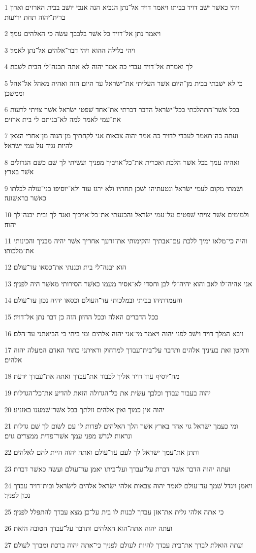 \par 1 ויהי כאשׁר ישׁב דויד בביתו ויאמר דויד אל־נתן הנביא הנה אנכי יושׁב בבית הארזים וארון ברית־יהוה תחת יריעות׃
\par 2 ויאמר נתן אל־דויד כל אשׁר בלבבך עשׂה כי האלהים עמך׃
\par 3 ויהי בלילה ההוא ויהי דבר־אלהים אל־נתן לאמר׃
\par 4 לך ואמרת אל־דויד עבדי כה אמר יהוה לא אתה תבנה־לי הבית לשׁבת׃
\par 5 כי לא ישׁבתי בבית מן־היום אשׁר העליתי את־ישׂראל עד היום הזה ואהיה מאהל אל־אהל וממשׁכן׃
\par 6 בכל אשׁר־התהלכתי בכל־ישׂראל הדבר דברתי את־אחד שׁפטי ישׂראל אשׁר צויתי לרעות את־עמי לאמר למה לא־בניתם לי בית ארזים׃
\par 7 ועתה כה־תאמר לעבדי לדויד כה אמר יהוה צבאות אני לקחתיך מן־הנוה מן־אחרי הצאן להיות נגיד על עמי ישׂראל׃
\par 8 ואהיה עמך בכל אשׁר הלכת ואכרית את־כל־אויביך מפניך ועשׂיתי לך שׁם כשׁם הגדולים אשׁר בארץ׃
\par 9 ושׂמתי מקום לעמי ישׂראל ונטעתיהו ושׁכן תחתיו ולא ירגז עוד ולא־יוסיפו בני־עולה לבלתו כאשׁר בראשׁונה׃
\par 10 ולמימים אשׁר צויתי שׁפטים על־עמי ישׂראל והכנעתי את־כל־אויביך ואגד לך ובית יבנה־לך יהוה׃
\par 11 והיה כי־מלאו ימיך ללכת עם־אבתיך והקימותי את־זרעך אחריך אשׁר יהיה מבניך והכינותי את־מלכותו׃
\par 12 הוא יבנה־לי בית וכננתי את־כסאו עד־עולם׃
\par 13 אני אהיה־לו לאב והוא יהיה־לי לבן וחסדי לא־אסיר מעמו כאשׁר הסירותי מאשׁר היה לפניך׃
\par 14 והעמדתיהו בביתי ובמלכותי עד־העולם וכסאו יהיה נכון עד־עולם׃
\par 15 ככל הדברים האלה וככל החזון הזה כן דבר נתן אל־דויד׃
\par 16 ויבא המלך דויד וישׁב לפני יהוה ויאמר מי־אני יהוה אלהים ומי ביתי כי הביאתני עד־הלם׃
\par 17 ותקטן זאת בעיניך אלהים ותדבר על־בית־עבדך למרחוק וראיתני כתור האדם המעלה יהוה אלהים׃
\par 18 מה־יוסיף עוד דויד אליך לכבוד את־עבדך ואתה את־עבדך ידעת׃
\par 19 יהוה בעבור עבדך וכלבך עשׂית את כל־הגדולה הזאת להדיע את־כל־הגדלות׃
\par 20 יהוה אין כמוך ואין אלהים זולתך בכל אשׁר־שׁמענו באזנינו׃
\par 21 ומי כעמך ישׂראל גוי אחד בארץ אשׁר הלך האלהים לפדות לו עם לשׂום לך שׁם גדלות ונראות לגרשׁ מפני עמך אשׁר־פדית ממצרים גוים׃
\par 22 ותתן את־עמך ישׂראל לך לעם עד־עולם ואתה יהוה היית להם לאלהים׃
\par 23 ועתה יהוה הדבר אשׁר דברת על־עבדך ועל־ביתו יאמן עד־עולם ועשׂה כאשׁר דברת׃
\par 24 ויאמן ויגדל שׁמך עד־עולם לאמר יהוה צבאות אלהי ישׂראל אלהים לישׂראל ובית־דויד עבדך נכון לפניך׃
\par 25 כי אתה אלהי גלית את־אזן עבדך לבנות לו בית על־כן מצא עבדך להתפלל לפניך׃
\par 26 ועתה יהוה אתה־הוא האלהים ותדבר על־עבדך הטובה הזאת׃
\par 27 ועתה הואלת לברך את־בית עבדך להיות לעולם לפניך כי־אתה יהוה ברכת ומברך לעולם׃


